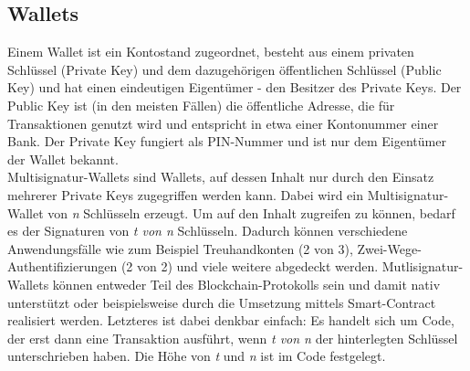 \subsection{Wallets}
\label{subsec:fundamentals:dlt:wallets}
Einem Wallet ist ein Kontostand zugeordnet, besteht aus einem privaten Schlüssel (Private Key) und dem dazugehörigen öffentlichen Schlüssel (Public Key) und hat einen eindeutigen Eigentümer - den Besitzer des Private Keys. Der Public Key ist (in den meisten Fällen) die öffentliche Adresse, die für Transaktionen genutzt wird und entspricht in etwa einer Kontonummer einer Bank. Der Private Key fungiert als PIN-Nummer und ist nur dem Eigentümer der Wallet bekannt.\\
Multisignatur-Wallets sind Wallets, auf dessen Inhalt nur durch den Einsatz mehrerer Private Keys zugegriffen werden kann. Dabei wird ein Multisignatur-Wallet von \textit{n} Schlüsseln erzeugt. Um auf den Inhalt zugreifen zu können, bedarf es der Signaturen von \textit{t von n} Schlüsseln. Dadurch können verschiedene Anwendungsfälle wie zum Beispiel Treuhandkonten (2 von 3), Zwei-Wege-Authentifizierungen (2 von 2) und viele weitere abgedeckt werden. Mutlisignatur-Wallets können entweder Teil des Blockchain-Protokolls sein und damit nativ unterstützt oder beispielsweise durch die Umsetzung mittels Smart-Contract realisiert werden. Letzteres ist dabei denkbar einfach: Es handelt sich um Code, der erst dann eine Transaktion ausführt, wenn \textit{t von n} der hinterlegten Schlüssel unterschrieben haben. Die Höhe von \textit{t} und \textit{n} ist im Code festgelegt.

